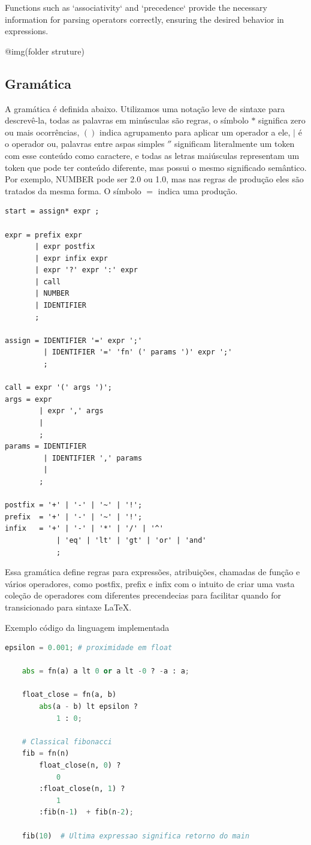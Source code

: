 \documentclass[english, 
               brazil, 
               bsc] %
               {dcomp-abntex2}
\begin{document}
Functions such as `associativity` and `precedence` provide the necessary information for parsing operators correctly, ensuring the desired behavior in expressions.

@img(folder struture)
\subsection{Gramática}

A gramática é definida abaixo. Utilizamos uma notação leve de sintaxe para descrevê-la, todas as palavras em minúsculas são regras, o símbolo $*$ significa zero ou mais ocorrências, $()$ indica agrupamento para aplicar um operador a ele, $|$ é o operador ou, palavras entre aspas simples $''$ significam literalmente um token com esse conteúdo como caractere, e todas as letras maiúsculas representam um token que pode ter conteúdo diferente, mas possui o mesmo significado semântico. Por exemplo, NUMBER pode ser 2.0 ou 1.0, mas nas regras de produção eles são tratados da mesma forma. O símbolo $=$ indica uma produção.

\begin{verbatim}
start = assign* expr ;

expr = prefix expr 
       | expr postfix  
       | expr infix expr 
       | expr '?' expr ':' expr
       | call
       | NUMBER
       | IDENTIFIER
       ;

assign = IDENTIFIER '=' expr ';'
         | IDENTIFIER '=' 'fn' (' params ')' expr ';'
         ; 

call = expr '(' args ')';
args = expr
        | expr ',' args
        | 
        ;
params = IDENTIFIER
         | IDENTIFIER ',' params
         | 
        ;

postfix = '+' | '-' | '~' | '!';
prefix  = '+' | '-' | '~' | '!';
infix   = '+' | '-' | '*' | '/' | '^'
            | 'eq' | 'lt' | 'gt' | 'or' | 'and'
            ;

\end{verbatim}

Essa gramática define regras para expressões, atribuições, chamadas de função e vários operadores, como postfix, prefix e infix com o intuito de criar uma vasta coleção de operadores com diferentes precendecias para facilitar quando for transicionado para sintaxe LaTeX.


\begin{algoritmo}[H]
	\caption{Exemplo código da linguagem implementada}
	\label{alg1}
	\label{alg1}
  \begin{lstlisting}[language = python]
    epsilon = 0.001; # proximidade em float

    abs = fn(a) a lt 0 or a lt -0 ? -a : a;

    float_close = fn(a, b) 
        abs(a - b) lt epsilon ? 
            1 : 0;

    # Classical fibonacci
    fib = fn(n)  
        float_close(n, 0) ? 
            0
        :float_close(n, 1) ?
            1
        :fib(n-1)  + fib(n-2);

    fib(10)  # Ultima expressao significa retorno do main
  \end{lstlisting}
\end{algoritmo}
\end{document}
